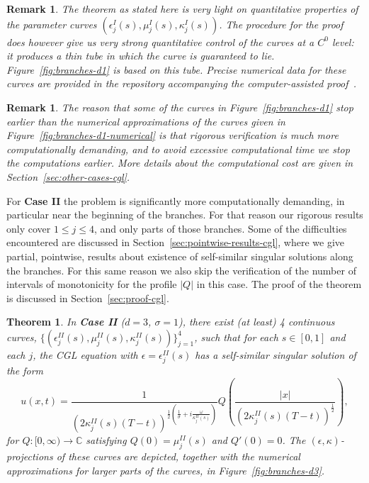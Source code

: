 \documentclass[11pt]{article}
\newtheorem{remark}[definition]{Remark}
\newtheorem{theorem}[definition]{Theorem}
\begin{document}
\begin{remark}
  The theorem as stated here is very light on quantitative properties
  of the parameter curves
  \((\epsilon_{j}^{I}(s), \mu_{j}^{I}(s), \kappa_{j}^{I}(s))\). The
  procedure for the proof does however give us very strong
  quantitative control of the curves at a \(C^{0}\) level: it produces
  a thin tube in which the curve is guaranteed to lie.
  Figure~\ref{fig:branches-d1} is based on this tube. Precise
  numerical data for these curves are provided in the repository
  accompanying the computer-assisted proof~\cite{CGL.jl}.
\end{remark}

\begin{remark}
  The reason that some of the curves in Figure~\ref{fig:branches-d1}
  stop earlier than the numerical approximations of the curves given
  in Figure~\ref{fig:branches-d1-numerical} is that rigorous
  verification is much more computationally demanding, and to avoid
  excessive computational time we stop the computations earlier. More
  details about the computational cost are given in
  Section~\ref{sec:other-cases-cgl}.
\end{remark}

For \textbf{Case II} the problem is significantly more computationally
demanding, in particular near the beginning of the branches. For that
reason our rigorous results only cover \(1 \leq j \leq 4\), and only
parts of those branches. Some of the difficulties encountered are
discussed in Section~\ref{sec:pointwise-results-cgl}, where we give
partial, pointwise, results about existence of self-similar singular
solutions along the branches. For this same reason we also skip the
verification of the number of intervals of monotonicity for the
profile \(|Q|\) in this case. The proof of the theorem is discussed in
Section~\ref{sec:proof-cgl}.

\begin{theorem}
  \label{thm:existence-cgl-case-2}
  In \textbf{Case II} (\(d = 3\), \(\sigma = 1\)), there exist (at
  least) 4 continuous curves,
  \(\{(\epsilon_{j}^{II}(s), \mu_{j}^{II}(s), \kappa_{j}^{II}(s))\}_{j
    = 1}^{4}\), such that for each \(s \in [0, 1]\) and each \(j\), the
  CGL equation with \(\epsilon = \epsilon_{j}^{II}(s)\) has a
  self-similar singular solution of the form
  \begin{equation*}
    u(x, t) = \dfrac{1}{(2\kappa_{j}^{II}(s)(T - t))^{\frac{1}{2}\left(\frac{1}{\sigma} + i \frac{\omega}{\kappa_{j}^{II}(s)}\right)}}
    Q\left(\dfrac{|x|}{(2\kappa_{j}^{II}(s)(T - t))^{\frac{1}{2}}}\right),
  \end{equation*}
  for \(Q \colon [0, \infty) \to \mathbb{C}\) satisfying
  \(Q(0) = \mu_{j}^{II}(s)\) and \(Q'(0) = 0\). The
  \((\epsilon, \kappa)\)-projections of these curves are depicted,
  together with the numerical approximations for larger parts of the
  curves, in Figure~\ref{fig:branches-d3}.
\end{theorem}
\end{document}
